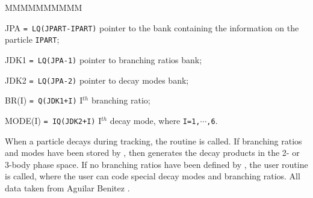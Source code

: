 \begin{DLtt}{MMMMMMMMMM}
\item[JPA] {\tt = LQ(JPART-IPART)} pointer to the bank containing the
information on the particle {\tt IPART};
\item[JDK1] {\tt = LQ(JPA-1)} pointer to branching ratios bank;
 \item[JDK2] {\tt = LQ(JPA-2)} pointer to decay modes bank;
\item[BR(I)] {\tt = Q(JDK1+I)}     I$^{th}$ branching ratio;
 \item[MODE(I)] {\tt = IQ(JDK2+I)}   I$^{th}$ decay mode, where
{\tt I=1,$\cdots$,6}.
\end{DLtt}
When a particle decays during tracking,
the routine  is called. If branching ratios and modes
have been stored by , then 
generates the decay products in the 2- or 3-body phase space.
If no branching ratios have been defined by ,
the user routine
 is called, where the user can code special decay modes and
branching ratios. All data taken from Aguilar Benitez \cite{bib-AGUI}.
\newpage

